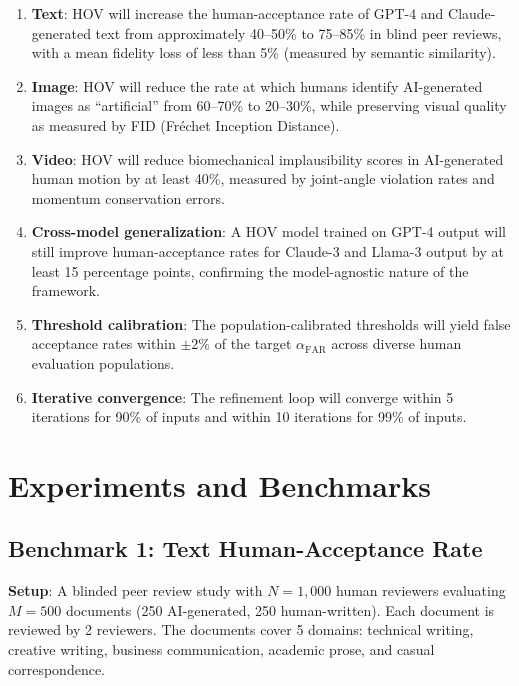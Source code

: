 \documentclass[12pt,oneside]{article}
\begin{document}
\begin{enumerate}[noitemsep]
    \item \textbf{Text}: HOV will increase the human-acceptance rate of GPT-4 and Claude-generated text from approximately 40--50\% to 75--85\% in blind peer reviews, with a mean fidelity loss of less than 5\% (measured by semantic similarity).
    
    \item \textbf{Image}: HOV will reduce the rate at which humans identify AI-generated images as ``artificial'' from 60--70\% to 20--30\%, while preserving visual quality as measured by FID (Fréchet Inception Distance).
    
    \item \textbf{Video}: HOV will reduce biomechanical implausibility scores in AI-generated human motion by at least 40\%, measured by joint-angle violation rates and momentum conservation errors.
    
    \item \textbf{Cross-model generalization}: A HOV model trained on GPT-4 output will still improve human-acceptance rates for Claude-3 and Llama-3 output by at least 15 percentage points, confirming the model-agnostic nature of the framework.
    
    \item \textbf{Threshold calibration}: The population-calibrated thresholds will yield false acceptance rates within $\pm 2\%$ of the target $\alpha_\text{FAR}$ across diverse human evaluation populations.
    
    \item \textbf{Iterative convergence}: The refinement loop will converge within 5 iterations for 90\% of inputs and within 10 iterations for 99\% of inputs.
\end{enumerate}

\section{Experiments and Benchmarks}

\subsection{Benchmark 1: Text Human-Acceptance Rate}

\textbf{Setup}: A blinded peer review study with $N = 1,000$ human reviewers evaluating $M = 500$ documents (250 AI-generated, 250 human-written). Each document is reviewed by 2 reviewers. The documents cover 5 domains: technical writing, creative writing, business communication, academic prose, and casual correspondence.
\end{document}

